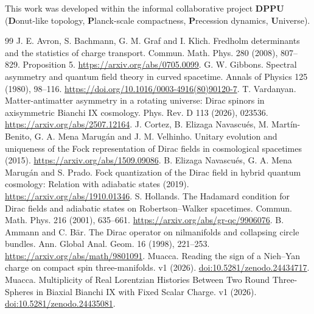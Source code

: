 \documentclass[11pt,a4paper]{article}
\begin{document}
This work was developed within the informal collaborative project \textbf{DPPU} (\textbf{D}onut-like topology, \textbf{P}lanck-scale compactness, \textbf{P}recession dynamics, \textbf{U}niverse).
\appendix


\begin{thebibliography}{99}\small
{} J. E. Avron, S. Bachmann, G. M. Graf and I. Klich. Fredholm determinants and the statistics of charge transport. Commun. Math. Phys. 280 (2008), 807--829. Proposition 5. \url{https://arxiv.org/abs/0705.0099}.
 G. W. Gibbons. Spectral asymmetry and quantum field theory in curved spacetime. Annals of Physics 125 (1980), 98--116. \url{https://doi.org/10.1016/0003-4916(80)90120-7}.
 T. Vardanyan. Matter-antimatter asymmetry in a rotating universe: Dirac spinors in axisymmetric Bianchi IX cosmology. Phys. Rev. D 113 (2026), 023536. \url{https://arxiv.org/abs/2507.12164}.
 J. Cortez, B. Elizaga Navascu\'es, M. Mart\'in-Benito, G. A. Mena Marug\'an and J. M. Velhinho. Unitary evolution and uniqueness of the Fock representation of Dirac fields in cosmological spacetimes (2015). \url{https://arxiv.org/abs/1509.09086}.
 B. Elizaga Navascu\'es, G. A. Mena Marug\'an and S. Prado. Fock quantization of the Dirac field in hybrid quantum cosmology: Relation with adiabatic states (2019). \url{https://arxiv.org/abs/1910.01346}.
 S. Hollands. The Hadamard condition for Dirac fields and adiabatic states on Robertson--Walker spacetimes. Commun. Math. Phys. 216 (2001), 635--661. \url{https://arxiv.org/abs/gr-qc/9906076}.
 B. Ammann and C. B\"ar. The Dirac operator on nilmanifolds and collapsing circle bundles. Ann. Global Anal. Geom. 16 (1998), 221--253. \url{https://arxiv.org/abs/math/9801091}.
 Muacca. Reading the sign of a Nieh--Yan charge on compact spin three-manifolds. v1 (2026). \href{https://doi.org/10.5281/zenodo.24434717}{doi:10.5281/zenodo.24434717}.
 Muacca. Multiplicity of Real Lorentzian Histories Between Two Round Three-Spheres in Biaxial Bianchi IX with Fixed Scalar Charge. v1 (2026). \href{https://doi.org/10.5281/zenodo.24435081}{doi:10.5281/zenodo.24435081}.
\end{thebibliography}
\end{document}
